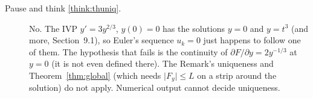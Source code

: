 \documentclass[11pt]{article}
\begin{document}
\begin{description}
  \item[Pause and think \ref{think:thuniq}.] No. The IVP $y'=3y^{2/3}$, $y(0)=0$ has the solutions $y=0$ and $y=t^3$ (and more, Section~9.1), so Euler's sequence $u_k=0$ just happens to follow one of them. The hypothesis that fails is the continuity of $\partial F/\partial y=2y^{-1/3}$ at $y=0$ (it is not even defined there). The Remark's uniqueness and Theorem~\ref{thm:global} (which needs $\lvert F_y\rvert\le L$ on a strip around the solution) do not apply. Numerical output cannot decide uniqueness.

\end{description}
\end{document}
